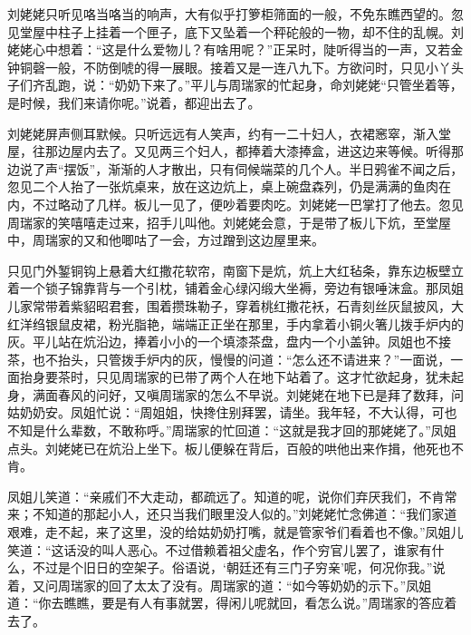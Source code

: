 \documentclass[12pt,oneside]{book}
\begin{document}
刘姥姥只听见咯当咯当的响声，大有似乎打箩柜筛面的一般，不免东瞧西望的。忽见堂屋中柱子上挂着一个匣子，底下又坠着一个秤砣般的一物，却不住的乱幌。刘姥姥心中想着：“这是什么爱物儿？有啥用呢？”正呆时，陡听得当的一声，又若金钟铜磬一般，不防倒唬的得一展眼。接着又是一连八九下。方欲问时，只见小丫头子们齐乱跑，说：“奶奶下来了。”平儿与周瑞家的忙起身，命刘姥姥“只管坐着等，是时候，我们来请你呢。”说着，都迎出去了。

刘姥姥屏声侧耳默候。只听远远有人笑声，约有一二十妇人，衣裙窸窣，渐入堂屋，往那边屋内去了。又见两三个妇人，都捧着大漆捧盒，进这边来等候。听得那边说了声“摆饭”，渐渐的人才散出，只有伺候端菜的几个人。半日鸦雀不闻之后，忽见二个人抬了一张炕桌来，放在这边炕上，桌上碗盘森列，仍是满满的鱼肉在内，不过略动了几样。板儿一见了，便吵着要肉吃。刘姥姥一巴掌打了他去。忽见周瑞家的笑嘻嘻走过来，招手儿叫他。刘姥姥会意，于是带了板儿下炕，至堂屋中，周瑞家的又和他唧咕了一会，方过蹭到这边屋里来。

只见门外錾铜钩上悬着大红撒花软帘，南窗下是炕，炕上大红毡条，靠东边板壁立着一个锁子锦靠背与一个引枕，铺着金心绿闪缎大坐褥，旁边有银唾沫盒。那凤姐儿家常带着紫貂昭君套，围着攒珠勒子，穿着桃红撒花袄，石青刻丝灰鼠披风，大红洋绉银鼠皮裙，粉光脂艳，端端正正坐在那里，手内拿着小铜火箸儿拨手炉内的灰。平儿站在炕沿边，捧着小小的一个填漆茶盘，盘内一个小盖钟。凤姐也不接茶，也不抬头，只管拨手炉内的灰，慢慢的问道：“怎么还不请进来？”一面说，一面抬身要茶时，只见周瑞家的已带了两个人在地下站着了。这才忙欲起身，犹未起身，满面春风的问好，又嗔周瑞家的怎么不早说。刘姥姥在地下已是拜了数拜，问姑奶奶安。凤姐忙说：“周姐姐，快搀住别拜罢，请坐。我年轻，不大认得，可也不知是什么辈数，不敢称呼。”周瑞家的忙回道：“这就是我才回的那姥姥了。”凤姐点头。刘姥姥已在炕沿上坐下。板儿便躲在背后，百般的哄他出来作揖，他死也不肯。

凤姐儿笑道：“亲戚们不大走动，都疏远了。知道的呢，说你们弃厌我们，不肯常来；不知道的那起小人，还只当我们眼里没人似的。”刘姥姥忙念佛道：“我们家道艰难，走不起，来了这里，没的给姑奶奶打嘴，就是管家爷们看着也不像。”凤姐儿笑道：“这话没的叫人恶心。不过借赖着祖父虚名，作个穷官儿罢了，谁家有什么，不过是个旧日的空架子。俗语说，‘朝廷还有三门子穷亲’呢，何况你我。”说着，又问周瑞家的回了太太了没有。周瑞家的道：“如今等奶奶的示下。”凤姐道：“你去瞧瞧，要是有人有事就罢，得闲儿呢就回，看怎么说。”周瑞家的答应着去了。
\end{document}
